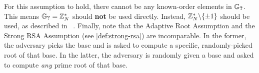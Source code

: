For this assumption to hold, there cannot be any known-order elements in $\mathbb{G}_{\textbf{?}}$.
This means $\mathbb{G}_{\textbf{?}} = \mathbb{Z}_N^*$ should \textbf{not} be used directly.
Instead, $\mathbb{Z}_N^* \backslash \{\pm 1\}$ should be used, as described in ~\cite{BBF19}.
Finally, note that the Adaptive Root Assumption and the Strong RSA Assumption (see \cref{def:strong-rsa}) are incomparable.
In the former, the adversary picks the base and is asked to compute a specific, randomly-picked root of that base.
In the latter, the adversary is randomly given a base and asked to compute \textit{any} prime root of that base.